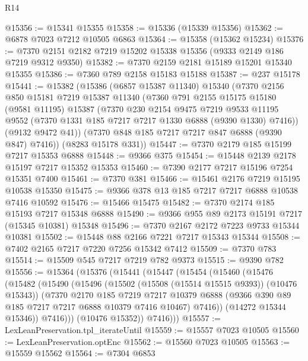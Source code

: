 \begin{lexlean}{R14}
\begin{coremodule}
@15356 := @15341 @15355
@15358 := @15336 (@15339 @15356)
@15362 := @6878 @7023 @7212 @10505 @6863
@15364 := @15358 (@15362 @15234)
@15376 := @7370 @2151 @2182 @7219 @15202 @15338 @15356 (@9333 @2149 @186 @7219 @9312 @9350)
@15382 := @7370 @2159 @2181 @15189 @15201 @15340 @15355
@15386 := @7360 @789 @2158 @15183 @15188
@15387 := @237 @15178
@15441 := @15382
    (@15386
      (@6857 @15387 @11340)
      @15340
      (@7370
        @2156
        @850
        @15181
        @7219
        @15387
        @11340
        (@7360
          @791
          @2155
          @15175
          @15180
          (@9581 @11195)
          @15387
          (@7370
            @230
            @2154
            @9475
            @7219
            @9533
            @11195
            @9552
            (@7370 @1331 @185 @7217 @7217 @1330 @6888 (@9390 @1330) @7416))
          (@9132 @9472 @41))
        (@7370 @848 @185 @7217 @7217 @847 @6888 (@9390 @847) @7416))
      (@8283 @15178 @331))
@15447 := @7370 @2179 @185 @15199 @7217 @15353 @6888
@15448 := @9366 @375
@15454 := @15448 @2139 @2178 @15197 @7217 @15352 @15353
@15460 := @7390 @2177 @7217 @15196 @7254 @15351 @7400
@15461 := @7370 @381
@15466 := @15461 @2176 @7219 @15195 @10538 @15350
@15475 := @9366 @378 @13 @185 @7217 @7217 @6888 @10538 @7416 @10592
@15476 := @15466 @15475
@15482 := @7370 @2174 @185 @15193 @7217 @15348 @6888
@15490 := @9366 @955 @89 @2173 @15191 @7217 (@15345 @10381) @15348
@15496 := @7370 @2167 @2172 @7223 @9733 @15344 @10381
@15502 := @15448 @88 @2166 @7221 @7217 @15343 @15344
@15508 := @7402 @2165 @7217 @7220 @7256 @15342 @7412
@15509 := @7370 @783
@15514 := @15509 @545 @7217 @7219 @782 @9373
@15515 := @9390 @782
@15556 := @15364
    (@15376
      (@15441
        (@15447
          (@15454
            (@15460
              (@15476
                (@15482
                  (@15490
                    (@15496
                      (@15502 (@15508 (@15514 @15515 @9393)) (@10476 @15343))
                      (@7370
                        @2170
                        @185
                        @7219
                        @7217
                        @10379
                        @6888
                        (@9366 @390 @89 @185 @7217 @7217 @6888 @10379 @7416 @10467)
                        @7416))
                    (@14272 @15344 @15346))
                  @7416)))
            (@10476 @15352))
          @7416)))
@15557 := LexLeanPreservation.tpl_iterateUntil
@15559 := @15557 @7023 @10505
@15560 := LexLeanPreservation.optEnc
@15562 := @15560 @7023 @10505
@15563 := @15559 @15562
@15564 := @7304 @6853

\end{coremodule}
\end{lexlean}
